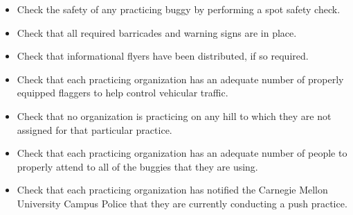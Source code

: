	\begin{itemize}

		\item Check the safety of any practicing buggy by performing a spot safety
		check.

		\item Check that all required barricades and warning signs are in place.

		\item Check that informational flyers have been distributed, if so
		required.

		\item Check that each practicing organization has an adequate number of
		properly equipped flaggers to help control vehicular traffic.

		\item Check that no organization is practicing on any hill to which they
		are not assigned for that particular practice.

		\item Check that each practicing organization has an adequate number of
		people to properly attend to all of the buggies that they are using.  \item
		Check that each practicing organization has notified the Carnegie Mellon
		University Campus Police that they are currently conducting a push practice.

	\end{itemize}


